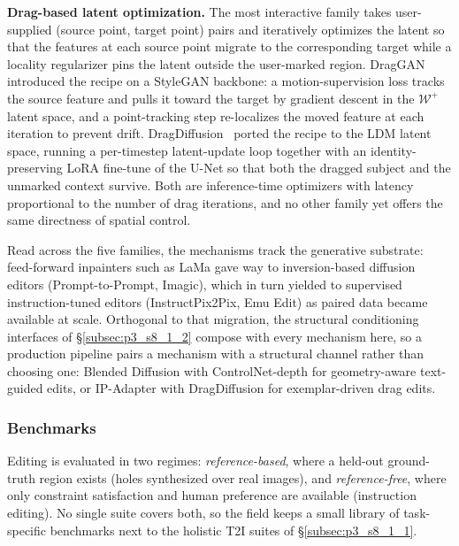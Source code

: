 \textbf{Drag-based latent optimization.}
The most interactive family takes user-supplied (source point, target point) pairs and iteratively optimizes the latent so that the features at each source point migrate to the corresponding target while a locality regularizer pins the latent outside the user-marked region.
DragGAN~\cite{pan2023draggan} introduced the recipe on a StyleGAN backbone: a motion-supervision loss tracks the source feature and pulls it toward the target by gradient descent in the $\mathcal{W}^+$ latent space, and a point-tracking step re-localizes the moved feature at each iteration to prevent drift.
DragDiffusion~\cite{shi2023dragdiffusion} ported the recipe to the LDM latent space, running a per-timestep latent-update loop together with an identity-preserving LoRA fine-tune of the U-Net so that both the dragged subject and the unmarked context survive.
Both are inference-time optimizers with latency proportional to the number of drag iterations, and no other family yet offers the same directness of spatial control.

Read across the five families, the mechanisms track the generative substrate: feed-forward inpainters such as LaMa gave way to inversion-based diffusion editors (Prompt-to-Prompt, Imagic), which in turn yielded to supervised instruction-tuned editors (InstructPix2Pix, Emu Edit) as paired data became available at scale.
Orthogonal to that migration, the structural conditioning interfaces of §\ref{subsec:p3_s8_1_2} compose with every mechanism here, so a production pipeline pairs a mechanism with a structural channel rather than choosing one: Blended Diffusion with ControlNet-depth for geometry-aware text-guided edits, or IP-Adapter with DragDiffusion for exemplar-driven drag edits.


\subsubsection{Benchmarks}
\label{subsubsec:p3_s8_1_3_benchmarks}
Editing is evaluated in two regimes: \emph{reference-based}, where a held-out ground-truth region exists (holes synthesized over real images), and \emph{reference-free}, where only constraint satisfaction and human preference are available (instruction editing).
No single suite covers both, so the field keeps a small library of task-specific benchmarks next to the holistic T2I suites of §\ref{subsec:p3_s8_1_1}.

